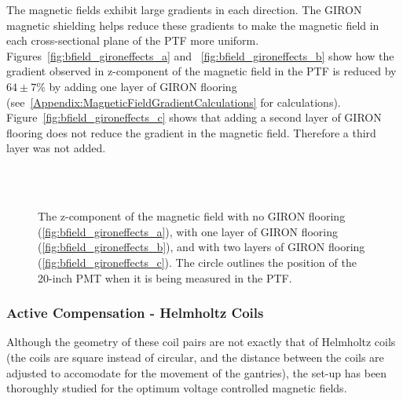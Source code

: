 The magnetic fields exhibit large gradients in each direction. The GIRON magnetic shielding helps reduce these gradients to make the magnetic field in each cross-sectional plane of the PTF more uniform. Figures~\ref{fig:bfield_gironeffects_a} and ~\ref{fig:bfield_gironeffects_b} show how the gradient observed in z-component of the magnetic field in the PTF is reduced by $ 64\pm7\% $ by adding one layer of GIRON flooring (see~\ref{Appendix:MagneticFieldGradientCalculations} for calculations).
Figure~\ref{fig:bfield_gironeffects_c} shows that adding a second layer of GIRON flooring does not reduce the gradient in the magnetic field. Therefore a third layer was not added.
%
\begin{figure}[htbp]
  \begin{center}
    \\
    \vspace{-10 mm}
    \\
    \vspace{-10 mm}
  \caption{The z-component of the magnetic field with no GIRON flooring (\ref{fig:bfield_gironeffects_a}), with one layer of GIRON flooring (\ref{fig:bfield_gironeffects_b}), and with two layers of GIRON flooring (\ref{fig:bfield_gironeffects_c}). The circle outlines the position of the 20-inch PMT when it is being measured in the PTF.}
  \label{fig:bfield_gironeffects}
  \end{center}
\end{figure}
%
\subsubsection{Active Compensation - Helmholtz Coils}

Although the geometry of these coil pairs are not exactly that of Helmholtz coils (the coils are square instead of circular, and the distance between the coils are adjusted to accomodate for the movement of the gantries), the set-up has been thoroughly studied for the optimum voltage controlled magnetic fields.

